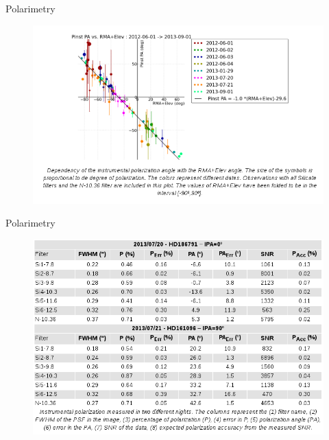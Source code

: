 \documentclass{beamer}
\begin{document}
\begin{frame}{Polarimetry}
\begin{figure}[H]
 \centering
 \includegraphics[scale=0.4]{img5.png}
\end{figure}
\end{frame}

\begin{frame}{Polarimetry}
\begin{figure}[H]
 \centering
 \includegraphics[scale=0.4]{img4.png}
\end{figure}
\end{frame}
\end{document}
